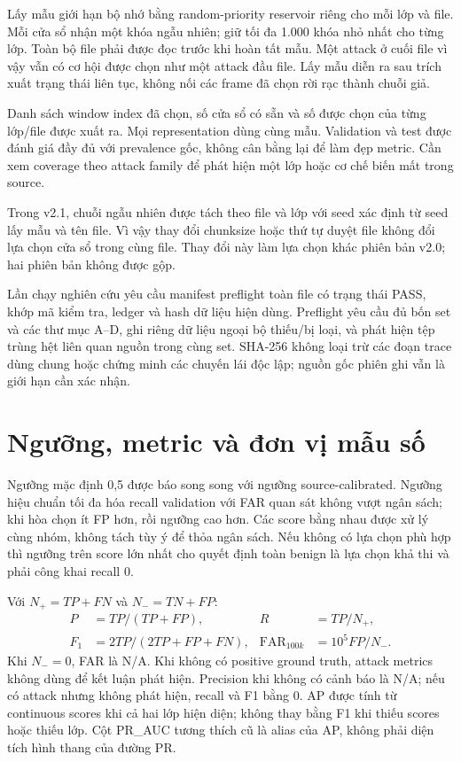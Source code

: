 \documentclass[12pt,a4paper,oneside,openany]{extbook}
\begin{document}
Lấy mẫu giới hạn bộ nhớ bằng random-priority reservoir riêng cho mỗi lớp và file. Mỗi cửa sổ nhận một khóa ngẫu nhiên; giữ tối đa 1.000 khóa nhỏ nhất cho từng lớp. Toàn bộ file phải được đọc trước khi hoàn tất mẫu. Một attack ở cuối file vì vậy vẫn có cơ hội được chọn như một attack đầu file. Lấy mẫu diễn ra sau trích xuất trạng thái liên tục, không nối các frame đã chọn rời rạc thành chuỗi giả.

Danh sách window index đã chọn, số cửa sổ có sẵn và số được chọn của từng lớp/file được xuất ra. Mọi representation dùng cùng mẫu. Validation và test được đánh giá đầy đủ với prevalence gốc, không cân bằng lại để làm đẹp metric. Cần xem coverage theo attack family để phát hiện một lớp hoặc cơ chế biến mất trong source.

Trong v2.1, chuỗi ngẫu nhiên được tách theo file và lớp với seed xác định từ seed lấy mẫu và tên file. Vì vậy thay đổi chunksize hoặc thứ tự duyệt file không đổi lựa chọn cửa sổ trong cùng file. Thay đổi này làm lựa chọn khác phiên bản v2.0; hai phiên bản không được gộp.

Lần chạy nghiên cứu yêu cầu manifest preflight toàn file có trạng thái PASS, khớp mã kiểm tra, ledger và hash dữ liệu hiện dùng. Preflight yêu cầu đủ bốn set và các thư mục A--D, ghi riêng dữ liệu ngoại bộ thiếu/bị loại, và phát hiện tệp trùng hệt liên quan nguồn trong cùng set. SHA-256 không loại trừ các đoạn trace dùng chung hoặc chứng minh các chuyến lái độc lập; nguồn gốc phiên ghi vẫn là giới hạn cần xác nhận.

\section{Ngưỡng, metric và đơn vị mẫu số}
Ngưỡng mặc định 0,5 được báo song song với ngưỡng source-calibrated. Ngưỡng hiệu chuẩn tối đa hóa recall validation với FAR quan sát không vượt ngân sách; khi hòa chọn ít FP hơn, rồi ngưỡng cao hơn. Các score bằng nhau được xử lý cùng nhóm, không tách tùy ý để thỏa ngân sách. Nếu không có lựa chọn phù hợp thì ngưỡng trên score lớn nhất cho quyết định toàn benign là lựa chọn khả thi và phải công khai recall 0.

Với $N_+=TP+FN$ và $N_-=TN+FP$:
\begin{align}
P&=TP/(TP+FP), & R&=TP/N_+,\\
F_1&=2TP/(2TP+FP+FN), & \operatorname{FAR}_{100k}&=10^5FP/N_-.
\end{align}
Khi $N_-=0$, FAR là N/A. Khi không có positive ground truth, attack metrics không dùng để kết luận phát hiện. Precision khi không có cảnh báo là N/A; nếu có attack nhưng không phát hiện, recall và F1 bằng 0. AP được tính từ continuous scores khi cả hai lớp hiện diện; không thay bằng F1 khi thiếu scores hoặc thiếu lớp. Cột PR\_AUC tương thích cũ là alias của AP, không phải diện tích hình thang của đường PR.
\end{document}
